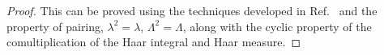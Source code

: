 \documentclass[a4paper,11pt]{article}
\theoremstyle{theorem}
\theoremstyle{remark}
\newcommand{\Rep}{\mathsf{Rep}}
\begin{document}
\begin{proof}
This can be proved using the techniques developed in Ref.~\cite[Section 7]{Jia2023weak} and the property of pairing, $\lambda^2=\lambda$, $\Lambda^2=\Lambda$, along with the cyclic property of the comultiplication of the Haar integral and Haar measure.
\end{proof}
























\end{document}
